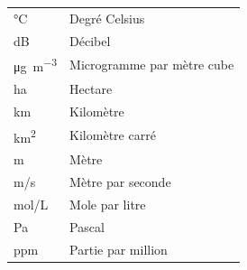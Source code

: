 \begin{tabularx}{\textwidth}{p{1.5cm} X}
    °C                          & Degré Celsius \\[4pt]
    dB                          & Décibel \\[4pt]
    \unit{\micro\g\per\m\cubed} & Microgramme par mètre cube \\[4pt]
    ha                          & Hectare \\[4pt]
    km                          & Kilomètre \\[4pt]
    km\textsuperscript{2}       & Kilomètre carré \\[4pt]
    m                           & Mètre \\[4pt]
    m/s                         & Mètre par seconde \\[4pt]
    mol/L                       & Mole par litre \\[4pt]
    Pa                          & Pascal \\[4pt]
    ppm                         & Partie par million \\
\end{tabularx}

\newpage